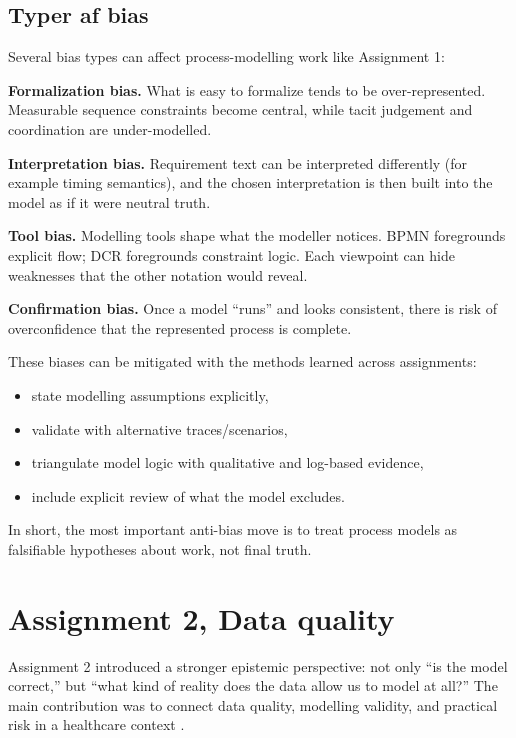 \subsection{Typer af bias}
\label{subsec:process_bias}

Several bias types can affect process-modelling work like Assignment 1:

\textbf{Formalization bias.} What is easy to formalize tends to be over-represented. Measurable sequence constraints become central, while tacit judgement and coordination are under-modelled.

\textbf{Interpretation bias.} Requirement text can be interpreted differently (for example timing semantics), and the chosen interpretation is then built into the model as if it were neutral truth.

\textbf{Tool bias.} Modelling tools shape what the modeller notices. BPMN foregrounds explicit flow; DCR foregrounds constraint logic. Each viewpoint can hide weaknesses that the other notation would reveal.

\textbf{Confirmation bias.} Once a model ``runs'' and looks consistent, there is risk of overconfidence that the represented process is complete.

These biases can be mitigated with the methods learned across assignments:
\begin{itemize}
    \item state modelling assumptions explicitly,
    \item validate with alternative traces/scenarios,
    \item triangulate model logic with qualitative and log-based evidence,
    \item include explicit review of what the model excludes.
\end{itemize}

In short, the most important anti-bias move is to treat process models as falsifiable hypotheses about work, not final truth.

\clearpage

\section{Assignment 2, Data quality}
\label{sec:assignment2_data_quality}

Assignment 2 introduced a stronger epistemic perspective: not only ``is the model correct,'' but ``what kind of reality does the data allow us to model at all?'' The main contribution was to connect data quality, modelling validity, and practical risk in a healthcare context \parencite{kristensen2026assignment2repo}.


